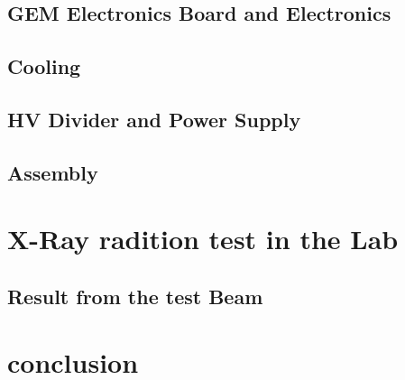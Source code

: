 
\smallskip
\subsection{GEM Electronics Board and Electronics}






\smallskip
\subsection{Cooling}








\smallskip
\subsection{HV Divider and Power Supply}







\smallskip
\subsection{Assembly}







\smallskip
\section{X-Ray radition test in the Lab}






\smallskip
\subsection{Result from the test Beam }






\smallskip
\section{conclusion}








